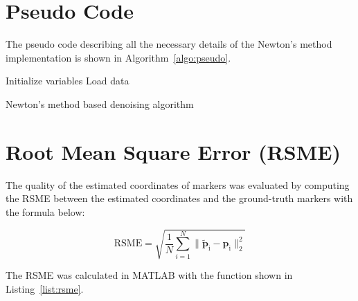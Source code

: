 \documentclass[12pt]{article}
\begin{document}
\section*{Pseudo Code}
The pseudo code describing all the necessary details of the Newton's method implementation is shown in Algorithm~\ref{algo:pseudo}.


\begin{algorithm}[H]
    Initialize variables\;
    Load data\;



    \caption{Newton's method based denoising algorithm}
    \label{algo:pseudo}
\end{algorithm}

\section*{Root Mean Square Error (RSME)}
The quality of the estimated coordinates of markers was evaluated by computing the RSME between the estimated coordinates and the ground-truth markers with the formula below:

\begin{equation}
    \text{RSME} = \sqrt{\frac{1}{N} \sum_{i=1}^{N} \lVert \mathbf{\tilde{p}}_\text{i} - \mathbf{p}_\text{i} \rVert_2^2} 
\end{equation}

The RSME was calculated in MATLAB with the function shown in Listing~\ref{list:rsme}.
\end{document}
